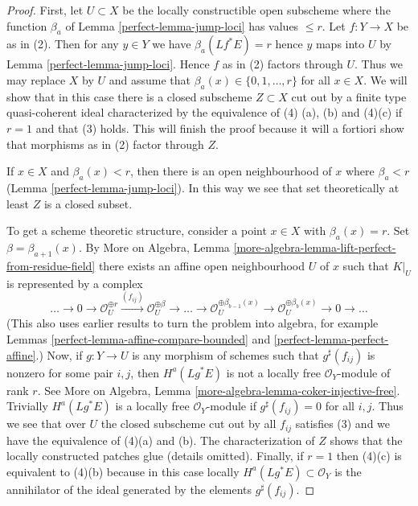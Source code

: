 \begin{proof}

First, let $U \subset X$ be the locally constructible
open subscheme where the function
$\beta_a$ of Lemma \ref{perfect-lemma-jump-loci} has values $\leq r$.
Let $f : Y \to X$ be as in (2). Then for any $y \in Y$
we have $\beta_a(Lf^*E) = r$ hence $y$ maps into $U$ by
Lemma \ref{perfect-lemma-jump-loci}. Hence $f$ as in (2) factors through $U$.
Thus we may replace $X$ by $U$ and assume that
$\beta_a(x) \in \{0, 1, \ldots, r\}$ for all $x \in X$.
We will show that in this case
there is a closed subscheme $Z \subset X$ cut out by a finite type
quasi-coherent ideal characterized
by the equivalence of (4) (a), (b) and (4)(c) if $r = 1$
and that (3) holds.
This will finish the proof because it will a fortiori show
that morphisms as in (2) factor through $Z$.

\medskip\noindent
If $x \in X$ and $\beta_a(x) < r$, then there is an
open neighbourhood of $x$ where $\beta_a < r$
(Lemma \ref{perfect-lemma-jump-loci}). In this way we
see that set theoretically at least $Z$ is a closed subset.

\medskip\noindent
To get a scheme theoretic structure, consider a point $x \in X$
with $\beta_a(x) = r$. Set $\beta = \beta_{a + 1}(x)$.
By More on Algebra, Lemma
\ref{more-algebra-lemma-lift-perfect-from-residue-field}
there exists an affine open neighbourhood $U$ of $x$
such that $K|_U$ is represented by a complex
$$
\ldots \to 0 \to \mathcal{O}_U^{\oplus r}
\xrightarrow{(f_{ij})} \mathcal{O}_U^{\oplus \beta} \to
\ldots \to
\mathcal{O}_U^{\oplus \beta_{b - 1}(x)} \to
\mathcal{O}_U^{\oplus \beta_b(x)} \to 0
\to \ldots
$$
(This also uses earlier results to turn the problem into algebra, for example
Lemmas \ref{perfect-lemma-affine-compare-bounded} and
\ref{perfect-lemma-perfect-affine}.) Now, if $g : Y \to U$ is any morphism
of schemes such that $g^\sharp(f_{ij})$ is nonzero for some pair $i, j$, then
$H^a(Lg^*E)$ is not a locally free $\mathcal{O}_Y$-module of rank $r$.
See More on Algebra, Lemma \ref{more-algebra-lemma-coker-injective-free}.
Trivially $H^a(Lg^*E)$ is a locally free $\mathcal{O}_Y$-module if
$g^\sharp(f_{ij}) = 0$ for all $i, j$. Thus we see that over $U$ the
closed subscheme cut out by all $f_{ij}$ satisfies
(3) and we have the equivalence of (4)(a) and (b).
The characterization of $Z$ shows that the locally constructed patches
glue (details omitted). Finally, if $r = 1$ then
(4)(c) is equivalent to (4)(b) because in this case locally
$H^a(Lg^*E) \subset \mathcal{O}_Y$ is the annihilator of the ideal generated
by the elements $g^\sharp(f_{ij})$.
\end{proof}


